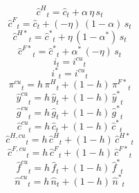 \begin{dmath}
{{\hat c^H}}_{t}={{\hat c}}_{t}+{{\alpha}}\, {{\eta}}\, {{s}}_{t}
\end{dmath}
\begin{dmath}
{{\hat c^F}}_{t}={{\hat c}}_{t}+\left(-{{\eta}}\right)\, \left(1-{{\alpha}}\right)\, {{s}}_{t}
\end{dmath}
\begin{dmath}
{{\hat c^{H*}}}_{t}={{\hat c^*}}_{t}+{{\eta}}\, \left(1-{{\alpha^*}}\right)\, {{s}}_{t}
\end{dmath}
\begin{dmath}
{{\hat c^{F*}}}_{t}={{\hat c^*}}_{t}+{{\alpha^*}}\, \left(-{{\eta}}\right)\, {{s}}_{t}
\end{dmath}
\begin{dmath}
{{i}}_{t}={{i^{cu}}}_{t}
\end{dmath}
\begin{dmath}
{{i^*}}_{t}={{i^{cu}}}_{t}
\end{dmath}
\begin{dmath}
{{\pi^{cu}}}_{t}={{h}}\, {{\pi^H}}_{t}+\left(1-{{h}}\right)\, {{\pi^{F*}}}_{t}
\end{dmath}
\begin{dmath}
{{\hat y^{cu}}}_{t}={{h}}\, {{\hat y}}_{t}+\left(1-{{h}}\right)\, {{\hat y^*}}_{t}
\end{dmath}
\begin{dmath}
{{\hat g^{cu}}}_{t}={{h}}\, {{\hat g}}_{t}+\left(1-{{h}}\right)\, {{\hat g^*}}_{t}
\end{dmath}
\begin{dmath}
{{\hat c^{cu}}}_{t}={{h}}\, {{\hat c}}_{t}+\left(1-{{h}}\right)\, {{\hat c^*}}_{t}
\end{dmath}
\begin{dmath}
{{\hat c^{H,cu}}}_{t}={{h}}\, {{\hat c^H}}_{t}+\left(1-{{h}}\right)\, {{\hat c^{H*}}}_{t}
\end{dmath}
\begin{dmath}
{{\hat c^{F,cu}}}_{t}={{h}}\, {{\hat c^F}}_{t}+\left(1-{{h}}\right)\, {{\hat c^{F*}}}_{t}
\end{dmath}
\begin{dmath}
{{\hat f^{cu}}}_{t}={{h}}\, {{\hat f}}_{t}+\left(1-{{h}}\right)\, {{\hat f^*}}_{t}
\end{dmath}
\begin{dmath}
{{\hat n^{cu}}}_{t}={{h}}\, {{\hat n}}_{t}+\left(1-{{h}}\right)\, {{\hat n^*}}_{t}
\end{dmath}

